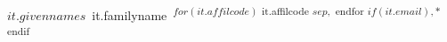 ${ it.givennames }\,${ it.familyname }\,\textsuperscript{${ for(it.affilcode) }${ it.affilcode }${ sep },${ endfor }${ if(it.email) },*${ endif }}